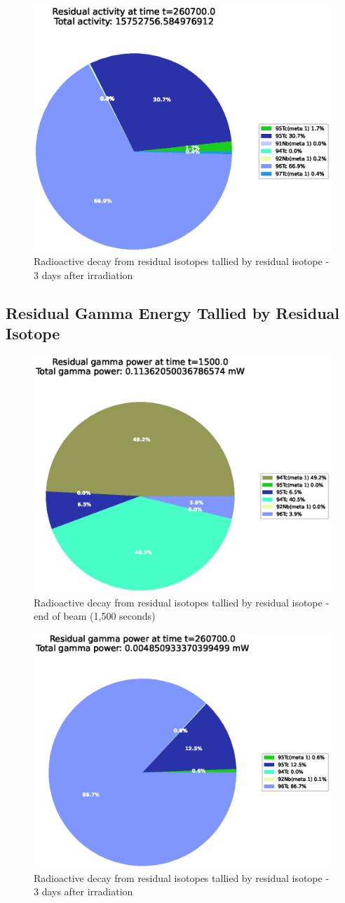 \begin{figure}[htb]
\centering
\includegraphics[width=0.5\linewidth]{chapters/activity_code/mo-john-hewett/thick/residual-activity/0400_260700.eps}
\caption{Radioactive decay from residual isotopes tallied by residual isotope - 3 days after irradiation}
\label{fig:moresidualisotopes3days}
\end{figure}



\subsection{Residual Gamma Energy Tallied by Residual Isotope}

\begin{figure}[htb]
\centering
\includegraphics[width=0.5\linewidth]{chapters/activity_code/mo-john-hewett/thick/residual-gamma-energy/0100_1500.eps}
\caption{Radioactive decay from residual isotopes tallied by residual isotope - end of beam (1,500 seconds)}
\label{fig:moresidualenergy1500s}
\end{figure}

\begin{figure}[htb]
\centering
\includegraphics[width=0.5\linewidth]{chapters/activity_code/mo-john-hewett/thick/residual-gamma-energy/0400_260700.eps}
\caption{Radioactive decay from residual isotopes tallied by residual isotope - 3 days after irradiation}
\label{fig:moresidualenergy3days}
\end{figure}




